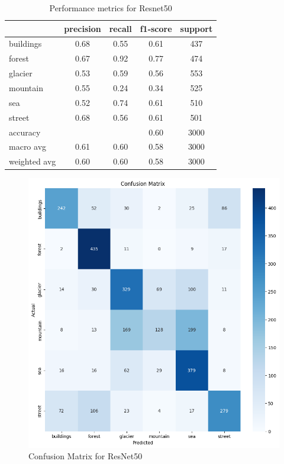 \documentclass[conference]{IEEEtran}
\begin{document}
\begin{table}[H]
\centering
\begin{tabular}{lcccc}
\toprule
\textbf{} & \textbf{precision} & \textbf{recall} & \textbf{f1-score} & \textbf{support} \\
\midrule
buildings & 0.68 & 0.55 & 0.61 & 437 \\
forest & 0.67 & 0.92 & 0.77 & 474 \\
glacier & 0.53 & 0.59 & 0.56 & 553 \\
mountain & 0.55 & 0.24 & 0.34 & 525 \\
sea & 0.52 & 0.74 & 0.61 & 510 \\
street & 0.68 & 0.56 & 0.61 & 501 \\
\midrule
accuracy & & & 0.60 & 3000 \\
macro avg & 0.61 & 0.60 & 0.58 & 3000 \\
weighted avg & 0.60 & 0.60 & 0.58 & 3000 \\
\bottomrule
\end{tabular}
\caption{Performance metrics for Resnet50}
\end{table}

\begin{figure}[H]
    \centering
    \includegraphics[width=1\linewidth]{images//ResNet50/ConfusionMatrixResnet50.png}
    \caption{Confusion Matrix for ResNet50}
    \label{fig:CM_Resnet}
\end{figure}
\end{document}
